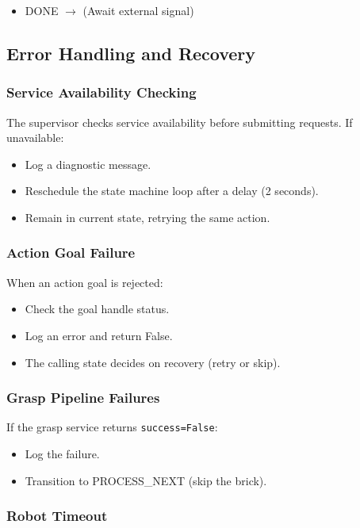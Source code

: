 \begin{itemize}
    \item DONE $\rightarrow$ (Await external signal)
\end{itemize}

\subsection{Error Handling and Recovery}

\subsubsection{Service Availability Checking}

The supervisor checks service availability before submitting requests. If unavailable:
\begin{itemize}
    \item Log a diagnostic message.
    \item Reschedule the state machine loop after a delay (2 seconds).
    \item Remain in current state, retrying the same action.
\end{itemize}

\subsubsection{Action Goal Failure}

When an action goal is rejected:
\begin{itemize}
    \item Check the goal handle status.
    \item Log an error and return False.
    \item The calling state decides on recovery (retry or skip).
\end{itemize}

\subsubsection{Grasp Pipeline Failures}

If the grasp service returns \texttt{success=False}:
\begin{itemize}
    \item Log the failure.
    \item Transition to PROCESS\_NEXT (skip the brick).
\end{itemize}

\subsubsection{Robot Timeout}

